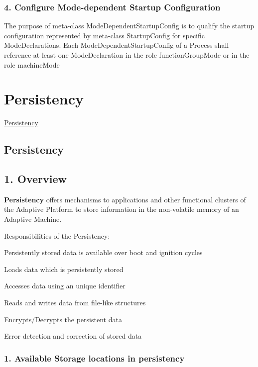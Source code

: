 \subsubsection*{4. Configure Mode-\/dependent Startup Configuration}

The purpose of meta-\/class Mode\+Dependent\+Startup\+Config is to qualify the startup configuration represented by meta-\/class Startup\+Config for specific Mode\+Declarations. Each Mode\+Dependent\+Startup\+Config of a Process shall reference at least one Mode\+Declaration in the role function\+Group\+Mode or in the role machine\+Mode \hypertarget{adaptive_persistency}{}\section{Persistency}\label{adaptive_persistency}

\begin{DoxyItemize}
\item \hyperlink{peristency_overview}{Persistency} 
\end{DoxyItemize}\hypertarget{peristency_overview}{}\subsection{Persistency}\label{peristency_overview}
\subsection*{1. Overview}

{\bfseries Persistency} offers mechanisms to applications and other functional clusters of the Adaptive Platform to store information in the non-\/volatile memory of an Adaptive Machine.

Responsibilities of the Persistency\+:
\begin{DoxyItemize}
\item Persistently stored data is available over boot and ignition cycles
\item Loads data which is persistently stored
\item Accesses data using an unique identifier
\item Reads and writes data from file-\/like structures
\item Encrypts/\+Decrypts the persistent data
\item Error detection and correction of stored data 
\end{DoxyItemize}

\subsubsection*{1. Available Storage locations in persistency}


